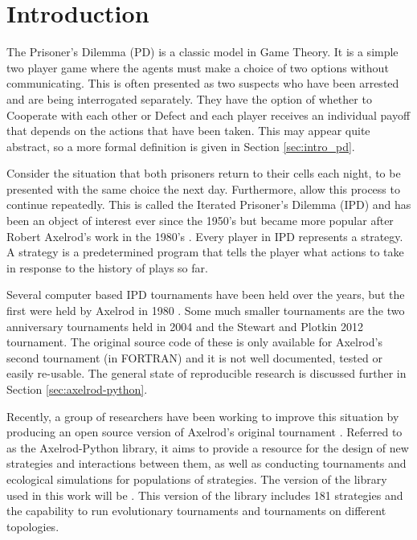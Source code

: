 
\chapter{Introduction}\label{cha:introduction}

The Prisoner's Dilemma (PD) is a classic model in Game Theory.
It is a simple two player game where the agents must make a choice of two options without communicating.
This is often presented as two suspects who have been arrested and are being interrogated separately.
They have the option of whether to Cooperate with each other or Defect and each player receives an individual payoff that depends on the actions that have been taken.
This may appear quite abstract, so a more formal definition is given in Section \ref{sec:intro_pd}.

Consider the situation that both prisoners return to their cells each night, to be presented with the same choice the next day.
Furthermore, allow this process to continue repeatedly.
This is called the Iterated Prisoner's Dilemma (IPD) and has been an object of interest ever since the 1950's but became more popular after Robert Axelrod's work in the 1980's \cite{Axelrod1980a, Axelrod1980b}.
Every player in IPD represents a strategy. A strategy is a predetermined program that tells the player what actions to take in response to the history of plays so far.

Several computer based IPD tournaments have been held over the years, but the first were held by Axelrod in 1980 \cite{Axelrod1980a, Axelrod1980b}.
Some much smaller tournaments are the two anniversary tournaments held in 2004 and the Stewart and Plotkin 2012 tournament.
The original source code of these is only available for Axelrod's second tournament (in FORTRAN) and it is not well documented, tested or easily re-usable.
The general state of reproducible research is discussed further in Section \ref{sec:axelrod-python}.

Recently, a group of researchers have been working to improve this situation by producing an open source version of Axelrod's original tournament \cite{Knight2016}.
Referred to as the Axelrod-Python library, it aims to provide a resource for the design of new strategies and interactions between them, as well as conducting tournaments and ecological simulations for populations of strategies.
The version of the library used in this work will be \cite{axelrodproject}.
This version of the library includes 181 strategies and the capability to run evolutionary tournaments and tournaments on different topologies.



